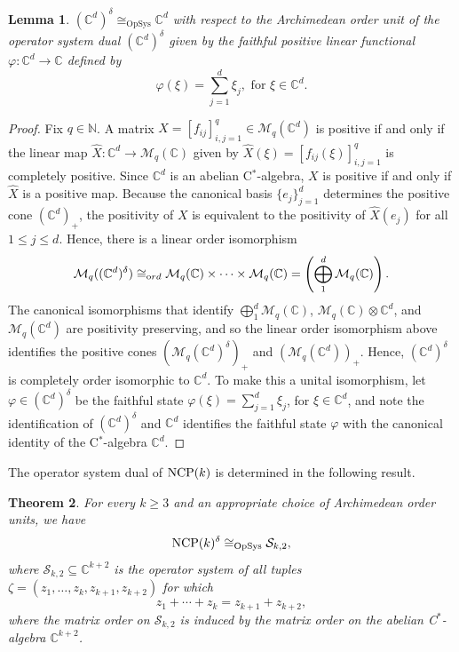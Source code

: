 \documentclass{amsart}
\newtheorem{theorem}{Theorem}[section]
\newtheorem{lemma}[theorem]{Lemma}
\theoremstyle{definition}
\theoremstyle{remark}
\newcommand{\M}{\mathcal{M}}
\newcommand\oss{{\mathcal S}}
\numberwithin{equation}{section}
\begin{document}
\begin{lemma}\label{dual_C^d} $(\mathbb C^d)^\delta\cong_{\textrm{OpSys}}\mathbb C^d$ with respect to  
	the Archimedean order unit of the operator system dual $(\mathbb C^d)^\delta$ 
	given by the faithful positive linear functional $\varphi:\mathbb C^d\rightarrow\mathbb C$ defined by 
	\[
	\varphi(\xi)=\sum_{j=1}^d \xi_j,\mbox{ for }\xi\in\mathbb C^d.
	\]
\end{lemma}
\begin{proof}
	Fix $q\in\mathbb N$. A matrix $X=[f_{ij}]_{i,j=1}^q\in\mathcal M_q(\mathbb C^d)$ is positive if and only if the linear map 
	$\hat{X} : \mathbb C^d\rightarrow \mathcal M_q(\mathbb C)$ given by $\hat{X}(\xi)=[f_{ij}(\xi)]_{i,j=1}^q$ is completely positive. Since $\mathbb C^d$ is an
	abelian C$^\ast$-algebra, $X$ is
 positive if and only if $\hat{X}$ is a positive map. Because the canonical basis $\{e_j\}_{j=1}^d$ determines the positive cone $(\mathbb C^d)_+$, 
 the positivity of $X$ is equivalent to the positivity of $\hat{X}(e_j)$ for all $1\leq j\leq d$. 
 Hence, there is a linear order isomorphism 
 \[
 \M_q((\mathbb C^d)^\delta)\cong_{\textrm ord}\M_q(\mathbb C)\times\dots\times\M_q(\mathbb C)= 
 \left(\displaystyle\bigoplus_1^d\M_q(\mathbb C)\right). 
 \]
 The canonical isomorphisms that identify $\displaystyle\bigoplus_1^d\M_q(\mathbb C)$, 
$\M_q(\mathbb C)\otimes\mathbb C^d$, and $\M_q(\mathbb C^d)$ are positivity preserving, and
so the linear order isomorphism above identifies the positive cones $(\M_q(\mathbb C^d)^\delta)_+$ and $(\M_q(\mathbb C^d))_+$. 	
Hence, $(\mathbb C^d)^\delta$ is completely order isomorphic to $\mathbb C^d$. To make this a unital isomorphism, let $\varphi\in(\mathbb C^d)^\delta$
be the faithful state $\varphi(\xi)=\sum_{j=1}^d \xi_j$, for $\xi\in\mathbb C^d$, and note the identification of $(\mathbb C^d)^\delta$ and $\mathbb C^d$ identifies the
faithful state $\varphi$ with the canonical identity of the C$^*$-algebra $\mathbb C^d$.
\end{proof}

The operator system dual of $\mbox{\textrm{NCP}}(k)$ is determined in the following result.

\begin{theorem}\label{dual ncp(k)} For every $k\geq 3$ and
an appropriate choice of Archimedean order units, we have
\[
\mbox{\textrm{NCP}}(k)^\delta\cong_{\textrm{OpSys}} \oss_{k,2},
\]
where $\oss_{k,2}\subseteq\mathbb C^{k+2}$ is the operator system of all tuples
$\zeta=(z_1,\dots,z_k,z_{k+1},z_{k+2})$ for which
\[
z_1 + \cdots + z_k = z_{k+1} + z_{k+2},
\]
where the matrix order on $\oss_{k,2}$ is induced by the matrix order on the abelian C$^*$-algebra $\mathbb C^{k+2}$.
\end{theorem}
\end{document}
